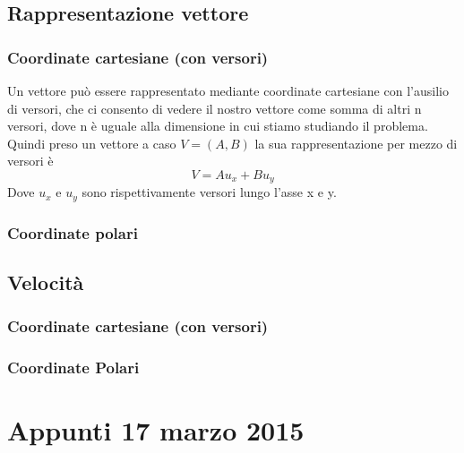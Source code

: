 \documentclass[portrait]{article}
\begin{document}
\subsection{Rappresentazione vettore}
\subsubsection{Coordinate cartesiane (con versori)}
Un vettore può essere rappresentato mediante coordinate cartesiane con l'ausilio di versori, che ci consento di vedere il nostro vettore come somma di altri n versori, dove n è uguale alla dimensione in cui stiamo studiando il problema. Quindi preso un vettore a caso $V = (A,B)$ la sua rappresentazione per mezzo di versori è 
$$V = Au_x + Bu_y$$
Dove $u_x$ e $u_y$ sono rispettivamente versori lungo l'asse x e y.
\subsubsection{Coordinate polari}
\subsection{Velocità}
\subsubsection{Coordinate cartesiane (con versori)}
\subsubsection{Coordinate Polari}
\section{Appunti 17 marzo 2015}
\end{document}
